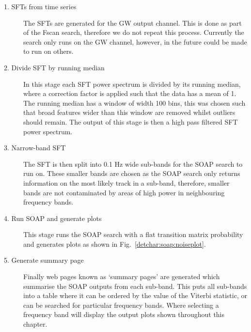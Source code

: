 \begin{description}
	\item[1. \glspl{SFT} from time series] The \glspl{SFT} are generated for the \gls{GW} output channel. This is done as part of the Fscan search, therefore we do not repeat this process. Currently the search only runs on the \gls{GW} channel, however, in the future could be made to run on others.
	
	\item[2. Divide \gls{SFT} by running median] In this stage each
\gls{SFT} power spectrum is divided by its running median, where a correction factor is applied such that the data has a mean of 1. 
The running median has a window of width 100 bins, this was chosen such that broad features wider than this window are removed whilst outliers should remain. 
The output of this stage is then a high pass filtered \gls{SFT} power spectrum.
	
        \item[3. Narrow-band \gls{SFT}] The \gls{SFT} is then split into 0.1 Hz
wide sub-bands for the SOAP search to run on. These smaller bands are chosen as
the SOAP search only returns information on the most likely track in a sub-band, therefore, smaller
bands are not contaminated by areas of high power in neighbouring frequency
bands. 
	
        \item[4. Run SOAP and generate plots] This stage runs the SOAP search
with a flat transition matrix probability and generates plots as shown in
Fig.~\ref{detchar:soap:noiseplot}.
	
        \item[5. Generate summary page] Finally web pages known as `summary pages' are generated which summarise the SOAP outputs from each sub-band.
        This puts all sub-bands into a table where it can be ordered
by the value of the Viterbi statistic, or can be searched for particular
frequency bands.  Where selecting a frequency band will display the output plots shown throughout this chapter.
\end{description}

